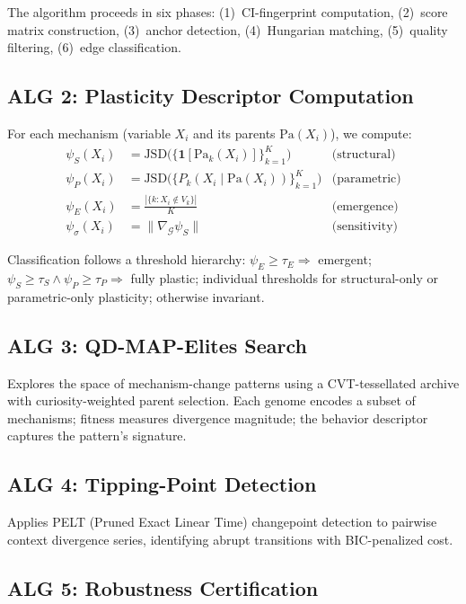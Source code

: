 \documentclass[11pt]{article}
\begin{document}
The algorithm proceeds in six phases: (1)~CI-fingerprint computation,
(2)~score matrix construction, (3)~anchor detection, (4)~Hungarian
matching, (5)~quality filtering, (6)~edge classification.

\subsection{ALG 2: Plasticity Descriptor Computation}

For each mechanism (variable $X_i$ and its parents $\text{Pa}(X_i)$),
we compute:
\begin{align}
  \psi_S(X_i) &= \text{JSD}\bigl(\{\mathbf{1}[\text{Pa}_k(X_i)]\}_{k=1}^K\bigr)
    & \text{(structural)} \\
  \psi_P(X_i) &= \text{JSD}\bigl(\{P_k(X_i \mid \text{Pa}(X_i))\}_{k=1}^K\bigr)
    & \text{(parametric)} \\
  \psi_E(X_i) &= \frac{|\{k : X_i \notin V_k\}|}{K}
    & \text{(emergence)} \\
  \psi_\sigma(X_i) &= \|\nabla_{\mathcal{G}} \psi_S\|
    & \text{(sensitivity)}
\end{align}

Classification follows a threshold hierarchy: $\psi_E \geq \tau_E
\Rightarrow$ emergent; $\psi_S \geq \tau_S \wedge \psi_P \geq \tau_P
\Rightarrow$ fully plastic; individual thresholds for structural-only
or parametric-only plasticity; otherwise invariant.

\subsection{ALG 3: QD-MAP-Elites Search}

Explores the space of mechanism-change patterns using a CVT-tessellated
archive with curiosity-weighted parent selection. Each genome encodes
a subset of mechanisms; fitness measures divergence magnitude; the
behavior descriptor captures the pattern's signature.

\subsection{ALG 4: Tipping-Point Detection}

Applies PELT (Pruned Exact Linear Time) changepoint detection to
pairwise context divergence series, identifying abrupt transitions
with BIC-penalized cost.

\subsection{ALG 5: Robustness Certification}
\end{document}
